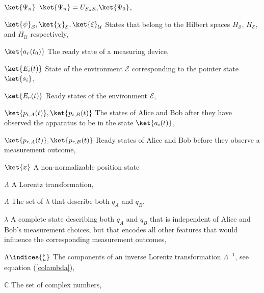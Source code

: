 \begin{thenomenclature}
  \item [{$\ket{\Psi_n}$}]\begingroup $\ket{\Psi_n}=U_{S_nS_0}\ket{\Psi_0}$, \nomrefpage{}
  \item [{$\ket{\psi}_{\mathcal{S}}, \ket{\chi}_{\mathcal{E}}, \ket{\xi}_{\mathcal{U}}$}]\begingroup States that belong to the Hilbert spaces $H_{\mathcal{S}}$, $H_{\mathcal{E}}$, and $H_{\mathcal{U}}$ respectively,  \nomrefpage{}
  \item [{$\ket{a_r(t_0)}$}]\begingroup The ready state of a measuring device, \nomrefpage{}
  \item [{$\ket{E_i(t)}$}]\begingroup State of the environment $\mathcal{E}$ corresponding to the pointer state $\ket{s_i}$, \nomrefpage{}
  \item [{$\ket{E_r(t)}$}]\begingroup Ready states of the environment $\mathcal{E}$, \nomrefpage{}
  \item [{$\ket{p_{i, A}(t)}, \ket{p_{i, B}(t)}$}]\begingroup The states of Alice and Bob after they have observed the apparatus to be in the state $\ket{a_i(t)}$, \nomrefpage{}
  \item [{$\ket{p_{r, A}(t)}, \ket{p_{r, B}(t)}$}]\begingroup Ready states of Alice and Bob before they observe a measurement outcome, \nomrefpage{}
  \item [{$\ket{x}$}]\begingroup A non-normalizable position state \nomrefpage{}
  \item [{$\Lambda$}]\begingroup A Lorentz transformation, \nomrefpage{}
  \item [{$\Lambda$}]\begingroup The set of $\lambda$ that describe both $q_A$ and $q_B$, \nomrefpage{}
  \item [{$\lambda$}]\begingroup A complete state describing both $q_A$ and $q_B$ that is independent of Alice and Bob's measurement choices, but that encodes all other features that would influence the corresponding measurement outcomes, \nomrefpage{}
  \item [{$\Lambda\indices{_\mu^\nu}$}]\begingroup The components of an inverse Lorentz transformation $\Lambda^{-1}$, see equation (\ref{colambda}), \nomrefpage{}
  \item [{$\mathbb {C}$}]\begingroup The set of complex numbers, \nomrefpage {}

\end{thenomenclature}
